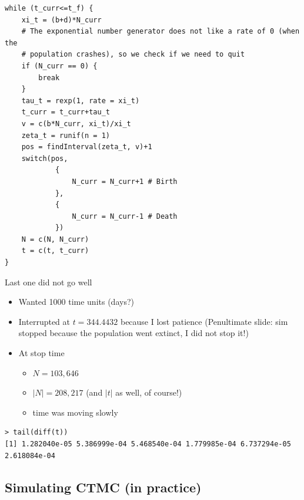 \documentclass[aspectratio=169]{beamer}
\begin{document}
\begin{frame}[fragile]
\begin{lstlisting}[language=Renhanced]
while (t_curr<=t_f) {
    xi_t = (b+d)*N_curr
    # The exponential number generator does not like a rate of 0 (when the 
    # population crashes), so we check if we need to quit
    if (N_curr == 0) {
        break
    }
    tau_t = rexp(1, rate = xi_t)
    t_curr = t_curr+tau_t
    v = c(b*N_curr, xi_t)/xi_t
    zeta_t = runif(n = 1)
    pos = findInterval(zeta_t, v)+1
    switch(pos,
            { 
                N_curr = N_curr+1 # Birth
            },
            {
                N_curr = N_curr-1 # Death
            })
    N = c(N, N_curr)
    t = c(t, t_curr)
}
\end{lstlisting}
\end{frame}



\begin{frame}[fragile]{Last one did not go well}
    \begin{itemize}
        \item Wanted 1000 time units (days?)
        \item Interrupted at $t=344.4432$ because I lost patience
        \newline (Penultimate slide: sim stopped because the population went extinct, I did not stop it!)
        \item At stop time
        \begin{itemize}
            \item $N = 103,646$
            \item $|N| = 208,217$ (and $|t|$ as well, of course!)
            \item time was moving slowly
        \end{itemize}
    \end{itemize}
    \vfill
    \begin{lstlisting}
> tail(diff(t))
[1] 1.282040e-05 5.386999e-04 5.468540e-04 1.779985e-04 6.737294e-05 2.618084e-04
    \end{lstlisting}
\end{frame}



\subsection{Simulating CTMC (in practice)}
\end{document}
